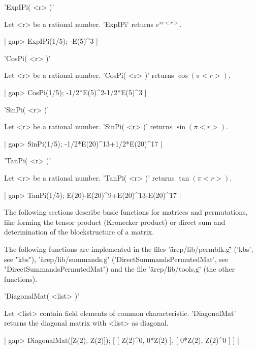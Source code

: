'ExpIPi( <r> )'

Let <r> be a rational number. 'ExpIPi' returns $e^{\pi i <r>}$.

|    gap> ExpIPi(1/5);
    -E(5)^3 |


'CosPi( <r> )'

Let <r> be a rational number. 'CosPi( <r> )' returns $\cos(\pi <r>)$.

|    gap> CosPi(1/5);
    -1/2*E(5)^2-1/2*E(5)^3 |


'SinPi( <r> )'

Let <r> be a rational number. 'SinPi( <r> )' returns $\sin(\pi <r>)$.

|    gap> SinPi(1/5);
     -1/2*E(20)^13+1/2*E(20)^17 |


'TanPi( <r> )'

Let <r> be a rational number. 'TanPi( <r> )' returns $\tan(\pi <r>)$.

|    gap> TanPi(1/5);
    E(20)-E(20)^9+E(20)^13-E(20)^17 |


The following sections describe basic functions for
matrices and permutations, like forming the tensor product 
(Kronecker product) or direct sum and determination
of the blockstructure of a matrix.

The following functions are implemented in the files
'\"arep/lib/permblk.g\"' ('kbs', see "kbs"), 
'\"arep/lib/summands.g\"' ('DirectSummandsPermutedMat', 
see "DirectSummandsPermutedMat") and the file '\"arep/lib/tools.g\"'
(the other functions).


'DiagonalMat( <list> )'

Let <list> contain field elements of common characteristic.
'DiagonalMat' returns the diagonal matrix with <list> as
diagonal.

|    gap> DiagonalMat([Z(2), Z(2)]);
    [ [ Z(2)^0, 0*Z(2) ], [ 0*Z(2), Z(2)^0 ] ] |

